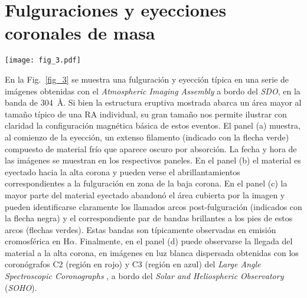 \documentclass[baaa]{baaa}
\begin{document}
\section{Fulguraciones y eyecciones coronales de masa}
\label{S_activity}

\begin{figure*}[!t]
\centering
\texttt{[image: fig\_3.pdf]}
\caption{Secuencia de imágenes en el EUV del {\sl SDO/AIA} en la banda de 304~\AA, correspondientes a la ECM observada el 31 de agosto de 2012 a partir de las 19:00 UT. La hora de observación de las imágenes se muestra en cada panel. (a) Al comienzo de la eyección se observa, indicado con la flecha verde, material filamentario en absorción, sostenido por la estructura magnética. (b) Al producirse la eyección la cuerda de flujo magnético que contiene el material es eyectada hacia la alta corona. (c) Por debajo de la estructura eyectada pueden identificarse los arcos post-fulguración (indicados con la flecha negra) y bandas brillantes en emisión en los pies de los arcos (indicadas con flechas verdes). (d) Imagen compuesta con datos del {\sl SDO/AIA} en el centro de la imagen y de los coronógrafos C2 (en rojo) y C3 (en azul) a bordo del {\sl Solar and Heliospheric Observatory (SOHO)}, mostrando la evolución posterior de la ECM.}
\label{fig_3}
\end{figure*}

En la Fig.~\ref{fig_3} se muestra una fulguración y eyección típica en una serie de imágenes obtenidas con el {\sl Atmospheric Imaging Assembly} \citep[{\sl AIA},][]{lemen2012} a bordo del {\sl SDO}, en la banda de 304~\AA. Si bien la estructura eruptiva mostrada abarca un área mayor al tamaño típico de una RA individual, su gran tamaño nos permite ilustrar con claridad la configuración magnética básica de estos eventos. El panel (a) muestra, al comienzo de la eyección, un extenso filamento (indicado con la flecha verde) compuesto de material frío que aparece oscuro por absorción. La fecha y hora de las imágenes se muestran en los respectivos paneles. En el panel (b) el material es eyectado hacia la alta corona y pueden verse el abrillantamientos correspondientes a la fulguración en zona de la baja corona. En el panel (c) la mayor parte del material eyectado abandonó el área cubierta por la imagen y pueden identificarse claramente los llamados arcos post-fulguración (indicados con la flecha negra) y el correspondiente par de bandas brillantes a los pies de estos arcos (flechas verdes). Estas bandas son típicamente observadas en emisión cromosférica en H$\alpha$. Finalmente, en el panel (d) puede observarse la llegada del material a la alta corona, en imágenes en luz blanca dispersada obtenidas con los coronógrafos C2 (región en rojo) y C3 (región en azul) del {\sl Large Angle Spectroscopic Coronographs} \citep[{\sl LASCO},][]{brueckner1995}, a bordo del {\sl Solar and Heliospheric Observatory} ({\sl SOHO}).
\end{document}
